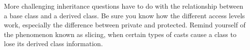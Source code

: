 More challenging inheritance questions have to do with the relationship between a base class and a derived class. Be sure you know how the different access levels work, especially the difference between private and protected. Remind yourself of the phenomenon known as slicing, when certain types of casts cause a class to lose its derived class information.










